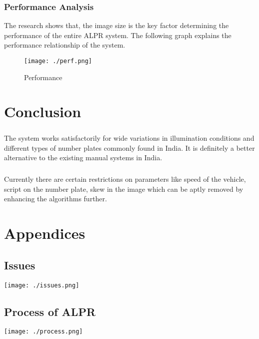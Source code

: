 \documentclass[a4paper,10pt]{iesreport}
\begin{document}
\newpage
\subsection*{Performance Analysis} 
  The research shows that, the image size is the key factor determining the performance of the entire ALPR system.
The following graph explains the performance relationship of the system.
\begin{figure}
\begin{center}
 \texttt{[image: ./perf.png]}
 \caption{Performance}
\end{center}
 \label{fig:perf}
\end{figure}

\chapter{Conclusion}
\paragraph*{}
The system works satisfactorily for wide variations
in illumination conditions and different types of
number plates commonly found in India. It is
definitely a better alternative to the existing manual
systems in India.
\paragraph*{}
Currently there are certain restrictions on
parameters like speed of the vehicle, script on the
number plate, skew in the image which can be aptly
removed by enhancing the algorithms further.
\newpage
{}
\newpage
\chapter*{Appendices}
\section*{Issues}
\begin{center}
 \texttt{[image: ./issues.png]}
\end{center}
\section*{Process of ALPR}
\begin{center}
 \texttt{[image: ./process.png]}
\end{center}


\newpage
{}

\end{document}
